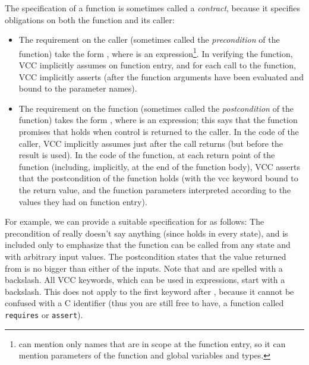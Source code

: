 The specification of a function is sometimes called a \emph{contract},
because it specifies obligations on both the function and its caller:
\begin{itemize}
\item The requirement on the caller (sometimes called the
  \emph{precondition} of the function) take the form 
  , 
  where  is an expression\footnote{ can mention
  only names that are in scope at the function entry, so it can
  mention parameters of the function and global variables and
  types.}.  In verifying the function, VCC implicitly assumes
   on function entry, and for each call to the function, VCC
  implicitly asserts  (after the function arguments have been
  evaluated and bound to the parameter names).

\item The requirement on the function (sometimes called the
  \emph{postcondition} of the function) takes the form
  , where  is an expression; this says that
  the function promises that  holds when control is returned to
  the caller.  In the code of the caller, VCC implicitly assumes 
  just after the call returns (but
  before the result is used). In the code of the function, at each return
  point of the function (including, implicitly,
  at the end of the function body), VCC asserts that the postcondition
  of the function holds (with the vcc keyword \vcc{\result} bound to the
  return value, and the function parameters 
  interpreted according to the values they had on function entry).
\end{itemize}

For example, we can provide a suitable specification for  as
follows: 
\noindent
The precondition  of  really doesn't say
anything (since \vcc{\true} holds in every state), and is included
only to emphasize that the function can be called from any state and
with arbitrary input values.
The postcondition states that the value returned from  
is no bigger than either of the inputs.
Note that \vcc{\true} and \vcc{\result} are spelled with a backslash.
All VCC keywords, which can be used in expressions, start with a backslash.
This does not apply to the first keyword after \vcc{_}, because it cannot
be confused with a C identifier (thus you are still free to have, \eg
a function called \texttt{requires} or \texttt{assert}).

